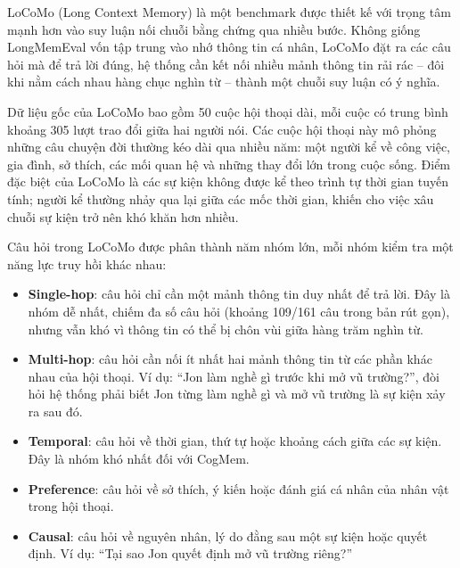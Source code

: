 \documentclass[../main.tex]{subfiles}
\begin{document}
LoCoMo (Long Context Memory) là một benchmark được thiết kế với trọng tâm mạnh hơn vào suy luận nối chuỗi bằng chứng qua nhiều bước. Không giống LongMemEval vốn tập trung vào nhớ thông tin cá nhân, LoCoMo đặt ra các câu hỏi mà để trả lời đúng, hệ thống cần kết nối nhiều mảnh thông tin rải rác -- đôi khi nằm cách nhau hàng chục nghìn từ -- thành một chuỗi suy luận có ý nghĩa.

Dữ liệu gốc của LoCoMo bao gồm 50 cuộc hội thoại dài, mỗi cuộc có trung bình khoảng 305 lượt trao đổi giữa hai người nói. Các cuộc hội thoại này mô phỏng những câu chuyện đời thường kéo dài qua nhiều năm: một người kể về công việc, gia đình, sở thích, các mối quan hệ và những thay đổi lớn trong cuộc sống. Điểm đặc biệt của LoCoMo là các sự kiện không được kể theo trình tự thời gian tuyến tính; người kể thường nhảy qua lại giữa các mốc thời gian, khiến cho việc xâu chuỗi sự kiện trở nên khó khăn hơn nhiều.

Câu hỏi trong LoCoMo được phân thành năm nhóm lớn, mỗi nhóm kiểm tra một năng lực truy hồi khác nhau:

\begin{itemize}
    \item \textbf{Single-hop}: câu hỏi chỉ cần một mảnh thông tin duy nhất để trả lời. Đây là nhóm dễ nhất, chiếm đa số câu hỏi (khoảng 109/161 câu trong bản rút gọn), nhưng vẫn khó vì thông tin có thể bị chôn vùi giữa hàng trăm nghìn từ.
    \item \textbf{Multi-hop}: câu hỏi cần nối ít nhất hai mảnh thông tin từ các phần khác nhau của hội thoại. Ví dụ: ``Jon làm nghề gì trước khi mở vũ trường?'', đòi hỏi hệ thống phải biết Jon từng làm nghề gì và mở vũ trường là sự kiện xảy ra sau đó.
    \item \textbf{Temporal}: câu hỏi về thời gian, thứ tự hoặc khoảng cách giữa các sự kiện. Đây là nhóm khó nhất đối với CogMem.
    \item \textbf{Preference}: câu hỏi về sở thích, ý kiến hoặc đánh giá cá nhân của nhân vật trong hội thoại.
    \item \textbf{Causal}: câu hỏi về nguyên nhân, lý do đằng sau một sự kiện hoặc quyết định. Ví dụ: ``Tại sao Jon quyết định mở vũ trường riêng?''
\end{itemize}
\end{document}
